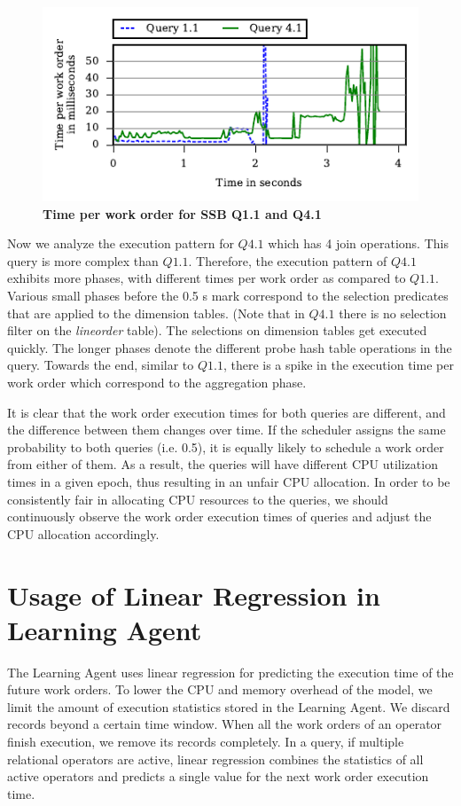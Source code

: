 \begin{figure}[h]
	\centering
	\includegraphics[width=\columnwidth]{policy/figures/q11-q41-time-per-wo.pdf}
	\caption{\textbf{Time per work order for SSB Q1.1 and Q4.1}}
	\label{fig:q1.1-q4.1-time-per-wo}
\end{figure}

Now we analyze the execution pattern for $Q4.1$ which has 4 join operations. 
This query is more complex than $Q1.1$.%
Therefore, the execution pattern of $Q4.1$ exhibits more phases, with different times per work order as compared to $Q1.1$.
Various small phases before the 0.5 s mark correspond to the selection predicates that are applied to the dimension tables. (Note that in $Q4.1$ there is no selection filter on the \textit{lineorder} table).
The selections on dimension tables get executed quickly.
The longer phases denote the different probe hash table operations in the query.
Towards the end, similar to $Q1.1$, there is a spike in the execution time per work order which correspond to the aggregation phase.

It is clear that the work order execution times for both queries are different, and the difference between them changes over time. 
If the scheduler assigns the same probability to both queries (i.e. 0.5), it is equally likely to schedule a work order from either of them. 
As a result, the queries will have different CPU utilization times in a given epoch, thus resulting in an unfair CPU allocation. 
In order to be consistently fair in allocating CPU resources to the queries, we should continuously observe the work order execution times of queries and adjust the CPU allocation accordingly. 

\section{Usage of Linear Regression in Learning Agent}\label{apx:linear-regression-usage}
The Learning Agent uses linear regression for predicting the execution time of the future work orders.
To lower the CPU and memory overhead of the model, we limit the amount of execution statistics stored in the Learning Agent.
We discard records beyond a certain time window. 
When all the work orders of an operator finish execution, we remove its records completely. 
In a query, if multiple relational operators are active, linear regression combines the statistics of all active operators and predicts a single value for the next work order execution time.

